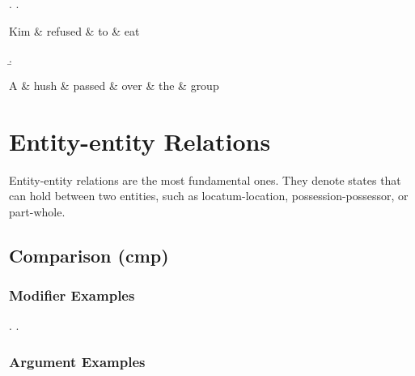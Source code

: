 \documentclass[a4paper]{article}
\begin{document}
\ex.
\a. \begin{dependency}
    \begin{deptext}
        Kim \& refused \& to \& eat \\
    \end{deptext}
\end{dependency}
\b. \begin{dependency}
    \begin{deptext}
        A \& hush \& passed \& over \& the \& group \\
    \end{deptext}
\end{dependency}


\clearpage
\section{Entity-entity Relations}

Entity-entity relations are the most fundamental ones. They denote states that
can hold between two entities, such as locatum-location, possession-possessor,
or part-whole.


\subsection{Comparison (\textsf{cmp})}
\label{sec:cmp}

\subsubsection{Modifier Examples}

\ex. \a. 

\subsubsection{Argument Examples}
\end{document}
